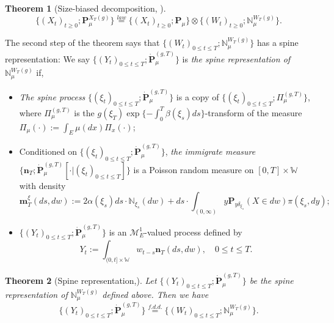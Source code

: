 \documentclass[12pt, a4paper]{amsart}
\newtheorem{thm}{Theorem}[section]
\theoremstyle{definition}
\numberwithin{equation}{section}
\begin{document}
\begin{thm}[Size-biased decomposition,  \cite{RenSongSun2017Spine}]\label{thm: size-biased decomposition}
\[
	\{(X_t)_{t\geq 0}; \mathbf P_\mu^{X_T(g)}\}
	\overset{law}{=} \{(X_t)_{t\geq 0}; \mathbf P_\mu \} \otimes \{(W_t)_{t\geq 0}; \mathbb N^{W_T(g)}_\mu\}.
\]
\end{thm}
	The second step of the theorem says that $\{(W_t)_{0\leq t\leq T}; \mathbb N^{W_T(g)}_\mu\}$ has a spine representation:
	We say $\{(Y_t)_{ 0\leq t\leq T}; \dot {\mathbf P}^{(g,T)}_\mu\}$ is \emph{the spine representation of $\mathbb N^{W_T(g)}_\mu$}  if,
\begin{itemize}
\item
	\emph{The spine process} $\{(\xi_t)_{0\leq t\leq T}; \dot{\mathbf P}^{(g,T)}_\mu\}$ is a copy of $\{(\xi_t)_{0\leq t\leq T}; \Pi^{(g,T)}_{\mu}\}$, where $\Pi^{(g,T)}_{\mu}$ is 
	the $g(\xi_T) \exp\{-\int_0^T \beta(\xi_s)ds\}$-transform
	of the measure $\Pi_{\mu}(\cdot):=\int_{E}\mu(dx)\Pi_x(\cdot) $;
\item
	Conditioned on $\{(\xi_t)_{0\leq t\leq T}; \dot{\mathbf P}^{(g,T)}_\mu\}$, \emph{the immigrate measure} $\{\mathbf n_T; \dot{\mathbf P}^{(g,T)}_\mu[\cdot |(\xi_t)_{0\leq t\leq T}]\}$ is a Poisson random measure on $[0,T] \times \mathbb W$ 
	with density
\[
	\mathbf m^\xi_T(ds,dw)
	:= 2 \alpha(\xi_s) ds \cdot \mathbb N_{\xi_s}(dw) + ds \cdot \int_{(0,\infty)} y \mathbf P_{y\delta_{\xi_s}}(X\in dw) \pi(\xi_s,dy);
\]
\item
	$\{(Y_t)_{0\leq t\leq T}; \dot{\mathbf P}^{(g,T)}_\mu\}$ is an $\mathcal M^1_E$-valued process defined by
\[
	Y_t
	:= \int_{(0,t] \times \mathbb W} w_{t-s} \mathbf n_T(ds,dw),
	\quad 0 \leq t\leq T.
\]
\end{itemize}

\begin{thm}[Spine representation,\cite{RenSongSun2017Spine}]\label{thm: spine representation}
	Let $\{(Y_t)_{0\leq t\leq T}; \dot {\mathbf P}^{(g,T)}_\mu\}$ be the spine representation of $\mathbb N^{W_T(g)}_\mu$ defined above.
	Then we have
\[
	\{(Y_t)_{0\leq t\leq T}; \dot{\mathbf P}^{(g,T)}_\mu\}
	\overset{f.d.d.}{=} \{(W_t)_{0\leq t\leq T}; \mathbb N_\mu^{W_T(g)}\}.
\]
\end{thm}
\end{document}
